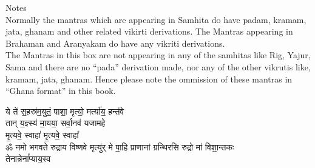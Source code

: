 \begin{english}
Notes \\
Normally the mantras which are appearing in Samhita do have padam, kramam, jata, ghanam and other related vikirti derivations. The Mantras appearing in Brahaman and Aranyakam do have any vikriti derivations. \\
The Mantras in this box are not appearing in any of the samhitas like Rig, Yajur, Sama and there are no “pada” derivation made, nor any of the other vikrutis like, kramam, jata, ghanam. Hence please note the ommission of these mantras in “Ghana format” in this book.\\
\end{english}

 {
\begin {sanskrit}
ये ते॑ स॒हस्र॑म॒युतं॒ पाशा॒ मृत्यो॒ मर्त्या॑य॒ हन्त॑वे \\
 तान् य॒ज्ञ्स्य॑ मा॒यया॒ सर्वा॒नव॑ यजामहे \\ 
 मृ॒त्यवे॒ स्वाहा॑ मृ॒त्यवे॒ स्वाहा᳚ \\
ॐ नमो भगवते रुद्राय विष्णवे मृत्यु॑र् मे पा॒हि  प्राणानां ग्रन्थिरसि रुद्रो मा॑ विशा॒न्तकः \\ 
 तेनान्नेना꣣प्याय॒स्व \\
 
\end{sanskrit}
}


